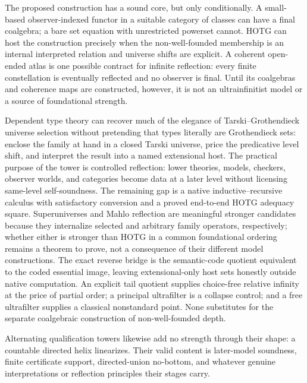 \documentclass[11pt]{article}
\theoremstyle{definition}
\theoremstyle{remark}
\begin{document}
The proposed construction has a sound core, but only conditionally.  A
small-based observer-indexed functor in a suitable category of classes can have a
final coalgebra; a bare set equation with unrestricted powerset cannot.  HOTG can
host the construction precisely when the non-well-founded membership is an
internal interpreted relation and universe shifts are explicit.  A coherent
open-ended atlas is one possible contract for infinite reflection: every finite
constellation is eventually reflected and no observer is final.  Until its
coalgebras and coherence maps are constructed, however, it is not an
ultrainfinitist model or a source of foundational strength.

Dependent type theory can recover much of the elegance of
Tarski--Grothendieck universe selection without pretending that types literally
are Grothendieck sets: enclose the family at hand in a closed Tarski universe,
price the predicative level shift, and interpret the result into a named
extensional host.  The practical purpose of the tower is controlled reflection:
lower theories, models, checkers, observer worlds, and categories become data at
a later level without licensing same-level self-soundness.  The remaining gap is
a native inductive--recursive calculus with satisfactory conversion and a proved
end-to-end HOTG adequacy square.  Superuniverses and Mahlo reflection are
meaningful stronger candidates because they internalize selected and arbitrary
family operators, respectively; whether either is stronger than HOTG in a common
foundational ordering remains a theorem to prove, not a consequence of their
different model constructions.  The exact reverse bridge is the semantic-code
quotient equivalent to the coded essential image, leaving extensional-only
host sets honestly outside native computation.  An explicit tail quotient
supplies choice-free relative infinity at the price of partial order; a
principal ultrafilter is a collapse
control; and a free ultrafilter supplies a classical nonstandard point.  None
substitutes for the separate coalgebraic construction of non-well-founded depth.

Alternating qualification towers likewise add no strength through their shape:
a countable directed helix linearizes.  Their valid content is later-model
soundness, finite certificate support, directed-union no-bottom, and whatever
genuine interpretations or reflection principles their stages carry.
\end{document}
